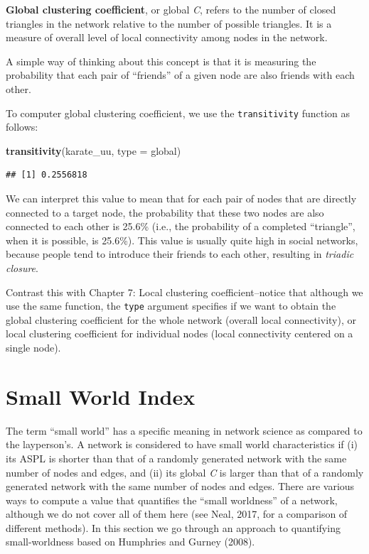 \documentclass[
]{book}
\newenvironment{Shaded}{\begin{snugshade}}{\end{snugshade}}
\newcommand{\AttributeTok}[1]{\textcolor[rgb]{0.13,0.29,0.53}{#1}}
\newcommand{\FunctionTok}[1]{\textcolor[rgb]{0.13,0.29,0.53}{\textbf{#1}}}
\newcommand{\NormalTok}[1]{#1}
\newcommand{\StringTok}[1]{\textcolor[rgb]{0.31,0.60,0.02}{#1}}
\begin{document}
\textbf{Global clustering coefficient}, or global \emph{C}, refers to the number of closed triangles in the network relative to the number of possible triangles. It is a measure of overall level of local connectivity among nodes in the network.

A simple way of thinking about this concept is that it is measuring the probability that each pair of ``friends'' of a given node are also friends with each other.

To computer global clustering coefficient, we use the \texttt{transitivity} function as follows:

\begin{Shaded}
\begin{Highlighting}[]
\FunctionTok{transitivity}\NormalTok{(karate\_uu, }\AttributeTok{type =} \StringTok{\textquotesingle{}global\textquotesingle{}}\NormalTok{)}
\end{Highlighting}
\end{Shaded}

\begin{verbatim}
## [1] 0.2556818
\end{verbatim}

We can interpret this value to mean that for each pair of nodes that are directly connected to a target node, the probability that these two nodes are also connected to each other is 25.6\% (i.e., the probability of a completed ``triangle'', when it is possible, is 25.6\%). This value is usually quite high in social networks, because people tend to introduce their friends to each other, resulting in \emph{triadic closure}.

Contrast this with Chapter 7: Local clustering coefficient--notice that although we use the same function, the \texttt{type} argument specifies if we want to obtain the global clustering coefficient for the whole network (overall local connectivity), or local clustering coefficient for individual nodes (local connectivity centered on a single node).

\section{Small World Index}\label{small-world-index}

The term ``small world'' has a specific meaning in network science as compared to the layperson's. A network is considered to have small world characteristics if (i) its ASPL is shorter than that of a randomly generated network with the same number of nodes and edges, and (ii) its global \emph{C} is larger than that of a randomly generated network with the same number of nodes and edges. There are various ways to compute a value that quantifies the ``small worldness'' of a network, although we do not cover all of them here (see Neal, 2017, for a comparison of different methods). In this section we go through an approach to quantifying small-worldness based on Humphries and Gurney (2008).
\end{document}
